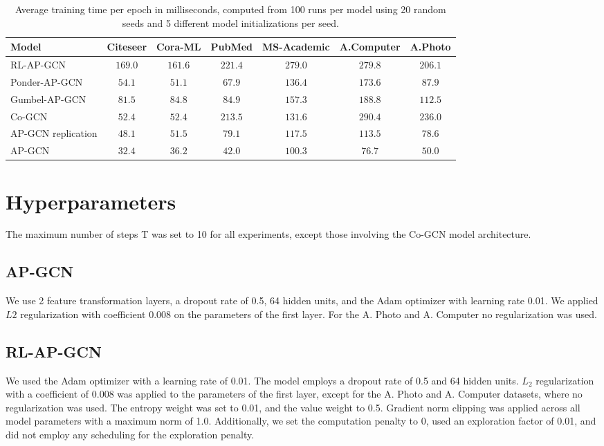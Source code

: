 \documentclass{gdl}
\begin{document}
\begin{table}[h]
    \small\sf\centering
    \caption{Average training time per epoch in milliseconds, computed from 100 runs per model using 20 random seeds and 5 different model initializations per seed.}
    \begin{tabular}{l c c c c c c}
        \toprule
        Model & Citeseer & Cora-ML & PubMed & MS-Academic & A.Computer & A.Photo   \\
        \midrule
        RL-AP-GCN &$169.0$&$161.6$&$221.4$&$279.0$&$279.8$&$206.1$  \\
        Ponder-AP-GCN &$54.1$&$51.1$&$67.9$&$136.4$&$173.6$&$87.9$   \\
        Gumbel-AP-GCN &$81.5$&$84.8$&$84.9$&$157.3$&$188.8$&$112.5$   \\
        Co-GCN &$52.4$&$52.4$&$213.5$&$131.6$&$290.4$&$236.0$  \\
        AP-GCN replication &$48.1$&$51.5$&$79.1$&$117.5$&$113.5$&$78.6$  \\
        \midrule
        AP-GCN & $32.4$ & $36.2$ & $42.0$ & $100.3$ & $76.7$ & $50.0$ \\
        \bottomrule 
    \end{tabular}
    \label{tab:time-per-epoch}
\end{table}

\newpage
\twocolumn


\clearpage


\clearpage

\appendix

\section{Hyperparameters}
The maximum number of steps T was set to 10 for all experiments, except those involving the Co-GCN model architecture.

\subsection{AP-GCN}
\label{lab:hyper-ap-gcn}
We use 2 feature transformation layers, a dropout rate of 0.5, 64 hidden units, and the Adam optimizer with learning rate 0.01. We applied $L2$ regularization with coefficient 0.008 on the parameters of the first layer. For the A. Photo and A. Computer no regularization was used.

\subsection{RL-AP-GCN}
\label{lab:hyper-rl-gcn}
We used the Adam optimizer with a learning rate of 0.01. The model employs a dropout rate of 0.5 and 64 hidden units. $L_2$ regularization with a coefficient of 0.008 was applied to the parameters of the first layer, except for the A. Photo and A. Computer datasets, where no regularization was used. The entropy weight was set to 0.01, and the value weight to 0.5. Gradient norm clipping was applied across all model parameters with a maximum norm of 1.0. Additionally, we set the computation penalty to 0, used an exploration factor of 0.01, and did not employ any scheduling for the exploration penalty.
\end{document}
